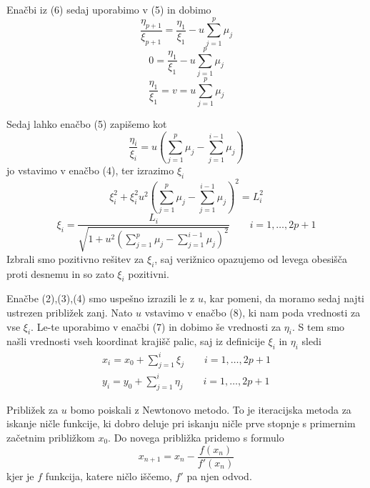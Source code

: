 \documentclass[A4paper, 11pt]{article}
\begin{document}
Enačbi iz (6) sedaj uporabimo v (5) in dobimo
\[ \frac{\eta_{p+1}}{\xi_{p+1}} =  \frac{\eta_1}{\xi_1} - u \sum_{j=1}^{p} \mu_j \]
\[ 0 =  \frac{\eta_1}{\xi_1} - u \sum_{j=1}^{p} \mu_j \]
\[ \frac{\eta_1}{\xi_1} = v =  u \sum_{j=1}^{p} \mu_j \]

Sedaj lahko enačbo (5) zapišemo kot
\begin{equation} 
\frac{\eta_{i}}{\xi_{i}} = u \left (\sum_{j=1}^{p} \mu_j - \sum_{j=1}^{i-1} \mu_j \right )
\end{equation}
jo vstavimo v enačbo (4), ter izrazimo $\xi_i$
\[ \xi_i ^2 + \xi_i ^ 2 u^2 \left (\sum_{j=1}^{p} \mu_j - \sum_{j=1}^{i-1} \mu_j \right ) ^2 = L_i ^2 \]
\begin{equation}
\xi_i = \frac{L_i}{\sqrt{1 + u^2 \left (\sum_{j=1}^{p} \mu_j - \sum_{j=1}^{i-1} \mu_j \right ) ^2}} \qquad i = 1, \ldots, 2p+1
\end{equation}
Izbrali smo pozitivno rešitev za $\xi_i$, saj verižnico opazujemo od levega obesišča proti desnemu in so zato $\xi_i$ pozitivni.

Enačbe (2),(3),(4) smo uspešno izrazili le z $u$, kar pomeni, da moramo sedaj najti ustrezen približek zanj. Nato $u$ vstavimo v enačbo (8), ki nam poda vrednosti za vse $\xi_i$. Le-te uporabimo v enačbi (7) in dobimo še vrednosti za $\eta_i$. S tem smo našli vrednosti vseh koordinat krajišč palic, saj iz definicije $\xi_i$ in $\eta_i$ sledi 
\begin{equation}
\begin{split}
x_i = x_0 + \sum_{j=1}^{i} \xi_j \qquad i = 1, \ldots, 2p+1 \\
y_i = y_0 + \sum_{j=1}^{i} \eta_j \qquad i = 1, \ldots, 2p+1
\end{split}
\end{equation}

Približek za $u$ bomo poiskali z Newtonovo metodo. To je iteracijska metoda za iskanje ničle funkcije, ki dobro deluje pri iskanju ničle prve stopnje s primernim začetnim približkom $x_0$. Do novega približka pridemo s formulo
\[ x_{n+1} = x_n - \frac{f(x_n)}{f'(x_n)} \]
kjer je $f$ funkcija, katere ničlo iščemo, $f'$ pa njen odvod. 
\end{document}
